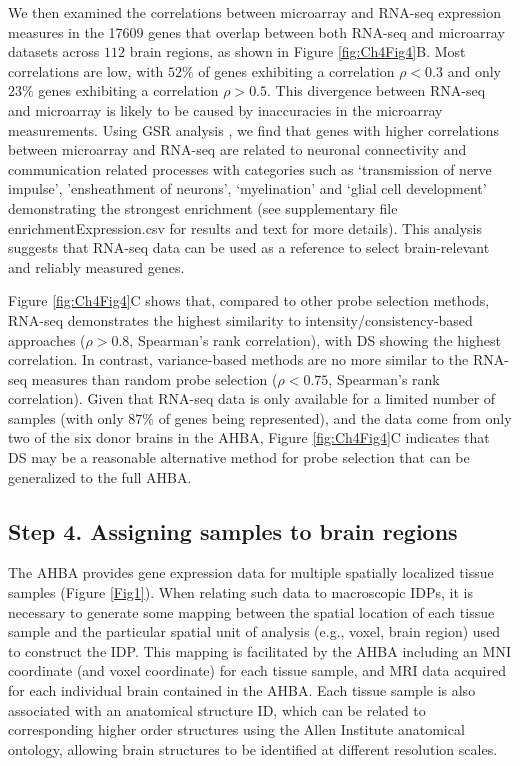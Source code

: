 \documentclass[10pt,A4]{article}
\begin{document}
We then examined the correlations between microarray and RNA-seq expression measures in the \num{17609} genes that overlap between both RNA-seq and microarray datasets across $112$ brain regions, as shown in Figure \ref{fig:Ch4Fig4}B. Most correlations are low, with $52\%$ of genes exhibiting a correlation $\rho < 0.3$ and only $23\%$ genes exhibiting a correlation $\rho > 0.5$. This divergence between RNA-seq and microarray is likely to be caused by inaccuracies in the microarray measurements. Using GSR analysis \citep{Gillis2010}, we find that genes with higher correlations between microarray and RNA-seq are related to neuronal connectivity and communication related processes with categories such as ‘transmission of nerve impulse’, ’ensheathment of neurons’, ‘myelination’ and ‘glial cell development’ demonstrating the strongest enrichment (see supplementary file enrichmentExpression.csv for results and  text for more details). This analysis suggests that RNA-seq data can be used as a reference to select brain-relevant and reliably measured genes.

Figure \ref{fig:Ch4Fig4}C shows that, compared to other probe selection methods, RNA-seq demonstrates the highest similarity to intensity/consistency-based approaches ($\rho > 0.8$, Spearman’s rank correlation), with DS showing the highest correlation. In contrast, variance-based methods are no more similar to the RNA-seq measures than random probe selection ($\rho < 0.75$, Spearman’s rank correlation). Given that RNA-seq data is only available for a limited number of samples (with only $87\%$ of genes being represented), and the data come from only two of the six donor brains in the AHBA, Figure \ref{fig:Ch4Fig4}C indicates that DS may be a reasonable alternative method for probe selection that can be generalized to the full AHBA.

\subsection*{Step 4. Assigning samples to brain regions}

The AHBA provides gene expression data for multiple spatially localized tissue samples (Figure \ref{Fig1}). When relating such data to macroscopic IDPs, it is necessary to generate some mapping between the spatial location of each tissue sample and the particular spatial unit of analysis (e.g., voxel, brain region) used to construct the IDP. This mapping is facilitated by the AHBA including an MNI coordinate (and voxel coordinate) for each tissue sample, and MRI data acquired for each individual brain contained in the AHBA. Each tissue sample is also associated with an anatomical structure ID, which can be related to corresponding higher order structures using the Allen Institute anatomical ontology, allowing brain structures to be identified at different resolution scales.
\end{document}
